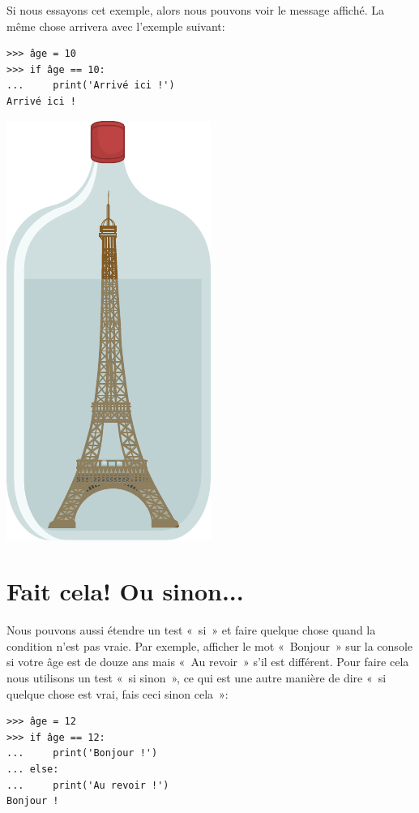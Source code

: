 Si nous essayons cet exemple, alors nous pouvons voir le message affiché. La même chose arrivera avec l'exemple suivant:

\begin{Verbatim}[frame=single,rulecolor=\color{green}, label=à taper avec attention]
>>> âge = 10
>>> if âge == 10:
...     print('Arrivé ici !')
Arrivé ici !
\end{Verbatim}

\begin{center}
\includegraphics[scale=1]{images/paris.pdf}
\end{center}

\section{Fait cela! Ou sinon...}

Nous pouvons aussi étendre un test «~si~» et faire quelque chose quand la condition n'est pas vraie. Par exemple, afficher le mot «~Bonjour~» sur la console si votre âge est de douze ans mais «~Au revoir~»  s'il est différent. Pour faire cela nous utilisons un test «~si sinon~», ce qui est une autre manière de dire «~si quelque chose est vrai, fais ceci sinon cela~»:

\begin{Verbatim}[frame=single,rulecolor=\color{green}, label=à taper avec attention]
>>> âge = 12
>>> if âge == 12:
...     print('Bonjour !')
... else:
...     print('Au revoir !')
Bonjour !
\end{Verbatim}

